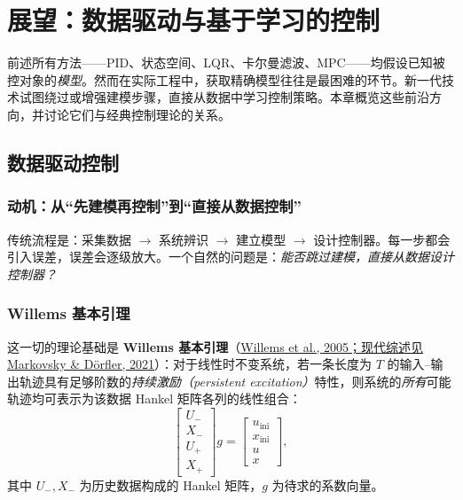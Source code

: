 \section{展望：数据驱动与基于学习的控制}

前述所有方法------PID、状态空间、LQR、卡尔曼滤波、MPC------均假设已知被控对象的\emph{模型}。然而在实际工程中，获取精确模型往往是最困难的环节。新一代技术试图绕过或增强建模步骤，直接从数据中学习控制策略。本章概览这些前沿方向，并讨论它们与经典控制理论的关系。

\subsection{数据驱动控制}

\subsubsection{动机：从``先建模再控制''到``直接从数据控制''}

传统流程是：采集数据 $\to$ 系统辨识 $\to$ 建立模型 $\to$ 设计控制器。每一步都会引入误差，误差会逐级放大。一个自然的问题是：\emph{能否跳过建模，直接从数据设计控制器？}

\subsubsection{Willems 基本引理}

这一切的理论基础是 \textbf{Willems 基本引理}（\href{https://arxiv.org/abs/2206.00397}{Willems et al., 2005；现代综述见 Markovsky \& Dörfler, 2021}）：对于线性时不变系统，若一条长度为 $T$ 的输入--输出轨迹具有足够阶数的\emph{持续激励（persistent excitation）}特性，则系统的\emph{所有}可能轨迹均可表示为该数据 Hankel 矩阵各列的线性组合：
\[
\begin{bmatrix} U_- \\ X_- \\ U_+ \\ X_+ \end{bmatrix} g = \begin{bmatrix} u_{\mathrm{ini}} \\ x_{\mathrm{ini}} \\ u \\ x \end{bmatrix},
\]
其中 $U_-, X_-$ 为历史数据构成的 Hankel 矩阵，$g$ 为待求的系数向量。

